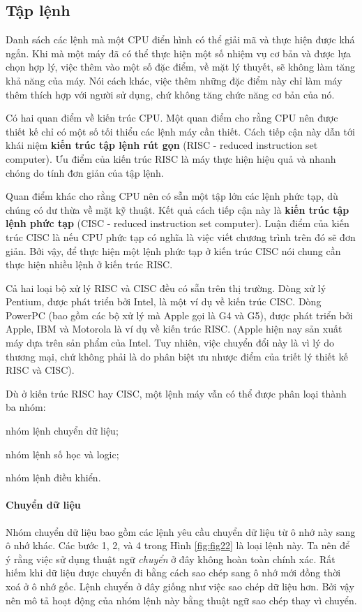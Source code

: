 \subsection*{Tập lệnh}
Danh sách các lệnh mà một CPU điển hình có thể giải mã và thực hiện được khá ngắn. Khi mà
một máy đã có thể thực hiện một số nhiệm vụ cơ bản và được lựa chọn hợp lý, việc thêm vào
một số đặc điểm, về mặt lý thuyết, sẽ không làm tăng khả năng của máy. Nói cách khác, việc
thêm những đặc điểm này chỉ làm máy thêm thích hợp với người sử dụng, chứ không tăng chức
năng cơ bản của nó.

Có hai quan điểm về kiến trúc CPU. Một quan điểm cho rằng CPU nên được thiết kế chỉ có một
số tối thiểu các lệnh máy cần thiết. Cách tiếp cận này dẫn tới khái niệm \textbf{kiến trúc
  tập lệnh rút gọn} (RISC - reduced instruction set computer). Ưu điểm của kiến trúc RISC
là máy thực hiện hiệu quả và nhanh chóng do tính đơn giản của tập lệnh.

Quan điểm khác cho rằng CPU nên có sẵn một tập lớn các lệnh phức tạp, dù chúng có dư thừa
về mặt kỹ thuật. Kết quả cách tiếp cận này là \textbf{kiến trúc tập lệnh phức tạp} (CISC -
reduced instruction set computer).  Luận điểm của kiến trúc CISC là nếu CPU phức tạp có
nghĩa là việc viết chương trình trên đó sẽ đơn giản.  Bởi vậy, để thực hiện một lệnh phức
tạp ở kiến trúc CISC nói chung cần thực hiện nhiều lệnh ở kiến trúc RISC.

Cả hai loại bộ xử lý RISC và CISC đều có sẵn trên thị trường. Dòng xử lý Pentium, được
phát triển bởi Intel, là một ví dụ về kiến trúc CISC. Dòng PowerPC (bao gồm các bộ xử lý
mà Apple gọi là G4 và G5), được phát triển bởi Apple, IBM và Motorola là ví dụ về kiến
trúc RISC.  (Apple hiện nay sản xuất máy dựa trên sản phẩm của Intel. Tuy nhiên, việc
chuyển đổi này là vì lý do thương mại, chứ không phải là do phân biệt ưu nhược điểm của
triết lý thiết kế RISC và CISC).

Dù ở kiến trúc RISC hay CISC, một lệnh máy vẫn có thể được phân loại thành ba
nhóm: \begin{inparaenum}[(1)]
\item nhóm lệnh chuyển dữ liệu;
\item nhóm lệnh số học và logic;
\item nhóm lệnh điều khiển.
\end{inparaenum}

\paragraph{Chuyển dữ liệu} Nhóm chuyển dữ liệu bao gồm các lệnh yêu cầu chuyển dữ liệu từ
ô nhớ này sang ô nhớ khác. Các bước 1, 2, và 4 trong Hình \ref{fig:fig22} là loại lệnh
này. Ta nên để ý rằng việc sử dụng thuật ngữ \textit{chuyển} ở đây không hoàn toàn chính
xác. Rất hiếm khi dữ liệu được chuyển đi bằng cách sao chép sang ô nhớ mới đồng thời xoá ở
ô nhớ gốc. Lệnh chuyển ở đây giống như việc sao chép dữ liệu hơn. Bởi vậy nên mô tả hoạt
động của nhóm lệnh này bằng thuật ngữ sao chép thay vì chuyển.

